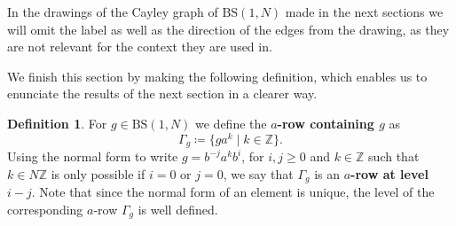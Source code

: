 \documentclass{aims}
\newcommand{\BS}[1][N]{\mathrm{BS}(1,#1)}
\theoremstyle{definition}
\newtheorem{definition}[theorem]{Definition}
\begin{document}
In the drawings of the Cayley graph of $\BS$ made in the next sections we will omit the label as well as the direction of the edges from the drawing, as they are not relevant for the context they are used in.

We finish this section by making the following definition, which enables us to enunciate the results of the next section in a clearer way.
\begin{definition}For $g\in \BS$ we define the \textbf{$a$-row containing $g$} as 
	$$
	\Gamma_g\coloneqq\{ ga^k\mid k\in \mathbb{Z}\}.
	$$
	Using the normal form to write $g=b^{-j}a^kb^i$, for $i,j\ge 0$ and $k\in \mathbb{Z}$ such that $k\in N\mathbb{Z}$ is only possible if $i=0$ or $j=0$, we say that $\Gamma_g$ is an \textbf{$a$-row at level } $i-j$. Note that since the normal form of an element is unique, the level of the corresponding $a$-row $\Gamma_g$ is well defined.
\end{definition}
\end{document}
